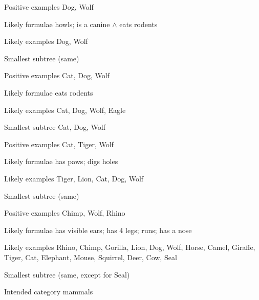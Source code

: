 \documentclass[apacite,jou]{apa6}
\newenvironment{rdescription}%
		{\begin{description}\raggedright}{\end{description}}
\begin{document}
\begin{rdescription} %
\item[Positive examples] Dog, Wolf 
\item[Likely formulae\footnotemark]
	 howls; is a canine $\wedge$
	eats rodents
\item[Likely examples\footnotemark]
	Dog, Wolf
\item[Smallest subtree\footnotemark]
	 (same)
\end{rdescription}

\begin{rdescription} %
\item[Positive examples] Cat, Dog, Wolf
\item[Likely formulae] eats rodents
\item[Likely examples]
	Cat, Dog, Wolf, Eagle
\item[Smallest subtree] Cat, Dog, Wolf
\end{rdescription}

\begin{rdescription}
\item[Positive examples] Cat, Tiger, Wolf
\item[Likely formulae] has paws; digs holes
\item[Likely examples]
	Tiger, Lion, Cat, Dog, Wolf %
\item[Smallest subtree]
	(same)
\end{rdescription}

\begin{rdescription}
\item[Positive examples] Chimp, Wolf, Rhino
\item[Likely formulae] has visible ears; has 4 legs; runs; has a nose
\item[Likely examples]
	Rhino, Chimp, Gorilla, Lion, Dog, Wolf, Horse, Camel, Giraffe,
	Tiger, Cat, Elephant, Mouse, Squirrel, Deer, Cow, Seal
\item[Smallest subtree]
	(same, except for Seal)
\item[Intended category] mammals
\end{rdescription}
\end{document}
